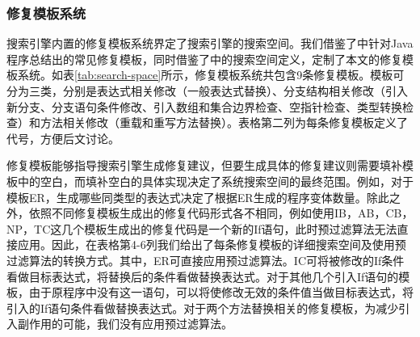 \subsubsection{修复模板系统}
搜索引擎内置的修复模板系统界定了搜索引擎的搜索空间。我们借鉴了\cite{kim2013automatic}中针对Java程序总结出的常见修复模板，同时借鉴了\cite{Long:2015:SPR:2786805.2786811}中的搜索空间定义，定制了本文的修复模板系统。如表\ref{tab:search-space}所示，修复模板系统共包含9条修复模板。模板可分为三类，分别是表达式相关修改（一般表达式替换）、分支结构相关修改（引入新分支、分支语句条件修改、引入数组和集合边界检查、空指针检查、类型转换检查）和方法相关修改（重载和重写方法替换）。表格第二列为每条修复模板定义了代号，方便后文讨论。

修复模板能够指导搜索引擎生成修复建议，但要生成具体的修复建议则需要填补模板中的空白，而填补空白的具体实现决定了系统搜索空间的最终范围。例如，对于模板ER，生成哪些同类型的表达式决定了根据ER生成的程序变体数量。除此之外，依照不同修复模板生成出的修复代码形式各不相同，例如使用IB，AB，CB，NP，TC这几个模板生成出的修复代码是一个新的If语句，此时预过滤算法无法直接应用。因此，在表格第4-6列我们给出了每条修复模板的详细搜索空间及使用预过滤算法的转换方式。其中，ER可直接应用预过滤算法。IC可将被修改的If条件看做目标表达式，将替换后的条件看做替换表达式。对于其他几个引入If语句的模板，由于原程序中没有这一语句，可以将使修改无效的条件值当做目标表达式，将引入的If语句条件看做替换表达式。对于两个方法替换相关的修复模板，为减少引入副作用的可能，我们没有应用预过滤算法。

